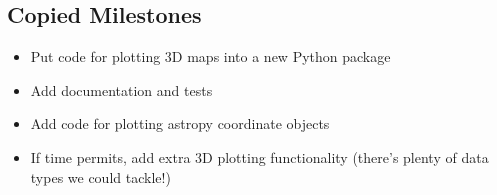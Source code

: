\subsection{Copied Milestones}
    \begin{itemize}
        \item Put code for plotting 3D maps into a new Python package
        \item Add documentation and tests
        \item Add code for plotting astropy coordinate objects
        \item If time permits, add extra 3D plotting functionality (there’s plenty of data types we could tackle!)
    \end{itemize}